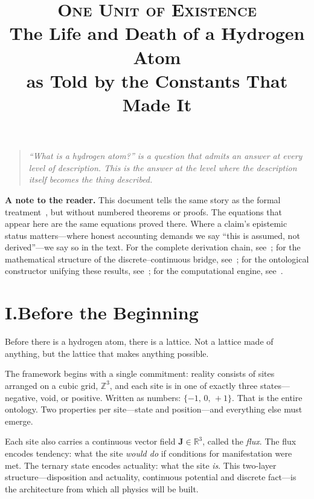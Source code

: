 \documentclass[11pt,a4paper]{article}
\title{\textsc{One Unit of Existence}\\[6pt]
\large The Life and Death of a Hydrogen Atom\\
as Told by the Constants That Made It}
\author{}
\date{}
\begin{document}
\maketitle
\thispagestyle{empty}

\begin{quote}\itshape
``What is a hydrogen atom?'' is a question that admits an answer at every
level of description. This is the answer at the level where the description
itself becomes the thing described.
\end{quote}

\noindent\textbf{A note to the reader.} This document tells the same story as the formal treatment~\cite{formal}, but without numbered theorems or proofs. The equations that appear here are the same equations proved there. Where a claim's epistemic status matters---where honest accounting demands we say ``this is assumed, not derived''---we say so in the text. For the complete derivation chain, see~\cite{chain}; for the mathematical structure of the discrete--continuous bridge, see~\cite{bridge}; for the ontological constructor unifying these results, see~\cite{constructor}; for the computational engine, see~\cite{engine}.

\section*{I.\quad Before the Beginning}

Before there is a hydrogen atom, there is a lattice. Not a lattice made of anything, but the lattice that makes anything possible.

The framework begins with a single commitment: reality consists of sites arranged on a cubic grid, $\mathbb{Z}^3$, and each site is in one of exactly three states---negative, void, or positive. Written as numbers: $\{-1,\, 0,\, +1\}$. That is the entire ontology. Two properties per site---state and position---and everything else must emerge.

Each site also carries a continuous vector field $\mathbf{J} \in \mathbb{R}^3$, called the \emph{flux}. The flux encodes tendency: what the site \emph{would do} if conditions for manifestation were met. The ternary state encodes actuality: what the site \emph{is}. This two-layer structure---disposition and actuality, continuous potential and discrete fact---is the architecture from which all physics will be built.
\end{document}
